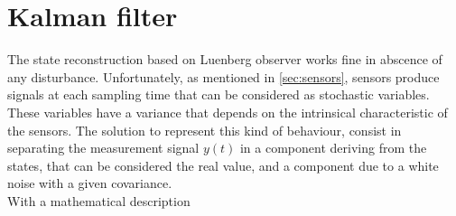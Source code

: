 \section{Kalman filter}

The state reconstruction based on Luenberg observer works fine in abscence of any disturbance. Unfortunately, as mentioned in \cref{sec:sensors}, sensors produce signals at each sampling time that can be considered as stochastic variables. These variables have a variance that depends on the intrinsical characteristic of the sensors. The solution to represent this kind of behaviour, consist in separating the measurement signal $y(t)$ in a component deriving from the states, that can be considered the real value, and a component due to a white noise with a given covariance.  \\
With a mathematical description 

